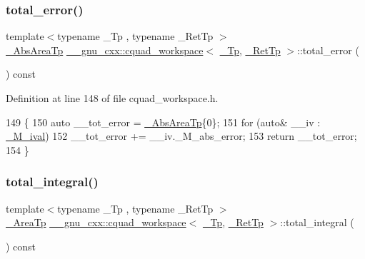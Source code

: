 \subsubsection{\texorpdfstring{total\+\_\+error()}{total\_error()}}
{\footnotesize\ttfamily template$<$typename \+\_\+\+Tp , typename \+\_\+\+Ret\+Tp $>$ \\
\hyperlink{struct____gnu__cxx_1_1cquad__workspace_a7abfe6354869dc61f6109c9e807ec152}{\+\_\+\+Abs\+Area\+Tp} \hyperlink{struct____gnu__cxx_1_1cquad__workspace}{\+\_\+\+\_\+gnu\+\_\+cxx\+::cquad\+\_\+workspace}$<$ \hyperlink{namespace____gnu__cxx_a3b19a9c800ca194374ef9172290f7d79}{\+\_\+\+Tp}, \hyperlink{namespace____gnu__cxx_a886e03ece3d53ff7fa6c098a40f93fa5}{\+\_\+\+Ret\+Tp} $>$\+::total\+\_\+error (\begin{DoxyParamCaption}{ }\end{DoxyParamCaption}) const\hspace{0.3cm}{\ttfamily [inline]}}



Definition at line 148 of file cquad\+\_\+workspace.\+h.


\begin{DoxyCode}
149       \{
150         \textcolor{keyword}{auto} \_\_tot\_error = \hyperlink{struct____gnu__cxx_1_1cquad__workspace_a7abfe6354869dc61f6109c9e807ec152}{\_AbsAreaTp}\{0\};
151         \textcolor{keywordflow}{for} (\textcolor{keyword}{auto}& \_\_iv : \hyperlink{struct____gnu__cxx_1_1cquad__workspace_a46edeb05c52f2a406dc582b404fe83e6}{\_M\_ival})
152           \_\_tot\_error += \_\_iv.\_M\_abs\_error;
153         \textcolor{keywordflow}{return} \_\_tot\_error;
154       \}
\end{DoxyCode}
\mbox{\label{struct____gnu__cxx_1_1cquad__workspace_aa429f45aacd05932104d5f91e6a0ff43}} 
\subsubsection{\texorpdfstring{total\+\_\+integral()}{total\_integral()}}
{\footnotesize\ttfamily template$<$typename \+\_\+\+Tp , typename \+\_\+\+Ret\+Tp $>$ \\
\hyperlink{struct____gnu__cxx_1_1cquad__workspace_a8eede64f10ac7bbf817992cd3d06fa8f}{\+\_\+\+Area\+Tp} \hyperlink{struct____gnu__cxx_1_1cquad__workspace}{\+\_\+\+\_\+gnu\+\_\+cxx\+::cquad\+\_\+workspace}$<$ \hyperlink{namespace____gnu__cxx_a3b19a9c800ca194374ef9172290f7d79}{\+\_\+\+Tp}, \hyperlink{namespace____gnu__cxx_a886e03ece3d53ff7fa6c098a40f93fa5}{\+\_\+\+Ret\+Tp} $>$\+::total\+\_\+integral (\begin{DoxyParamCaption}{ }\end{DoxyParamCaption}) const\hspace{0.3cm}{\ttfamily [inline]}}




